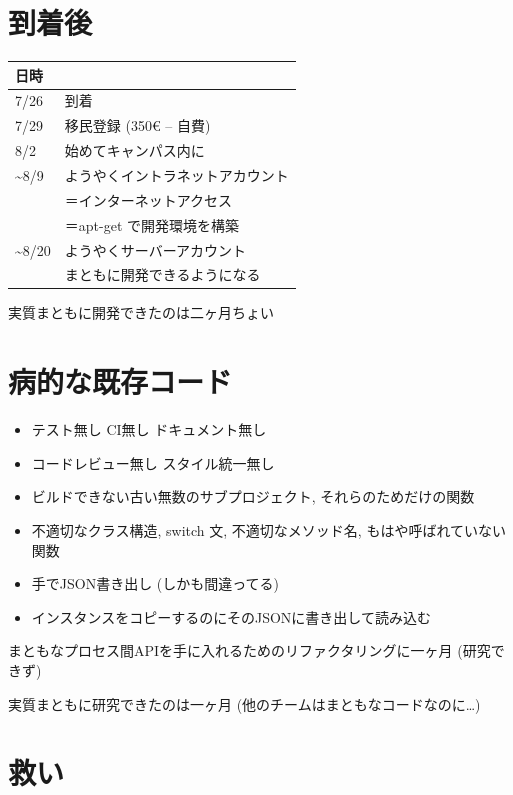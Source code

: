 \section{到着後}
\label{sec-11}

\begin{center}
\begin{tabular}{ll}
日時 & \\
\hline
7/26 & 到着\\
7/29 & 移民登録 (350€ -- 自費)\\
8/2 & 始めてキャンパス内に\\
\textasciitilde{}8/9 & ようやくイントラネットアカウント\\
 & ＝インターネットアクセス\\
 & ＝apt-get で開発環境を構築\\
\textasciitilde{}8/20 & ようやくサーバーアカウント\\
 & まともに開発できるようになる\\
\end{tabular}
\end{center}

実質まともに開発できたのは二ヶ月ちょい

\section{病的な既存コード}
\label{sec-12}

\begin{itemize}
\item テスト無し CI無し ドキュメント無し
\item コードレビュー無し スタイル統一無し
\item ビルドできない古い無数のサブプロジェクト, それらのためだけの関数
\item 不適切なクラス構造, switch 文, 不適切なメソッド名, もはや呼ばれていない関数
\item 手でJSON書き出し (しかも間違ってる)
\item インスタンスをコピーするのにそのJSONに書き出して読み込む
\end{itemize}

まともなプロセス間APIを手に入れるためのリファクタリングに一ヶ月 (研究できず)

実質まともに研究できたのは一ヶ月 (他のチームはまともなコードなのに…)

\section{救い}
\label{sec-13}

